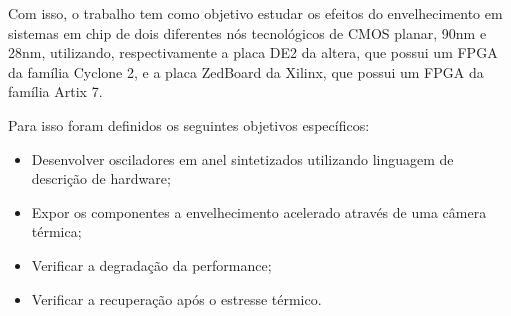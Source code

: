 Com isso, o trabalho tem como objetivo estudar os efeitos do envelhecimento em sistemas em chip de dois diferentes nós tecnológicos de CMOS planar, 90nm e 28nm, utilizando, respectivamente a placa DE2 da altera, que possui um FPGA da família Cyclone 2, e a placa ZedBoard da Xilinx, que possui um FPGA da família Artix 7.

Para isso foram definidos os seguintes objetivos específicos:
\begin{itemize}
    \item Desenvolver osciladores em anel sintetizados utilizando linguagem de descrição de hardware;
    \item Expor os componentes a envelhecimento acelerado através de uma câmera térmica;
    \item Verificar a degradação da performance;
    \item Verificar a recuperação após o estresse térmico.
\end{itemize}









